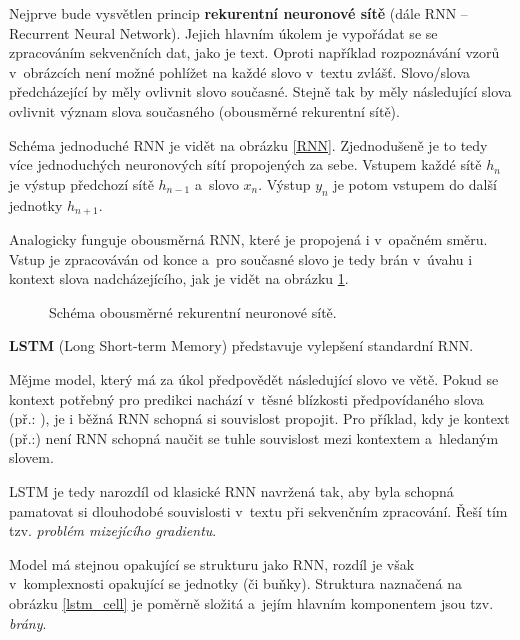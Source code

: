 Nejprve bude vysvětlen princip \textbf{rekurentní neuronové sítě} (dále RNN -- Recurrent Neural Network).
Jejich hlavním úkolem je vypořádat se se zpracováním sekvenčních dat, jako je text. Oproti například rozpoznávání vzorů v~obrázcích není možné pohlížet na každé slovo v~textu zvlášť. Slovo/slova předcházející by měly ovlivnit slovo současné. Stejně tak by měly následující slova ovlivnit význam slova současného (obousměrné rekurentní sítě).\par
Schéma jednoduché RNN je vidět na obrázku \ref{RNN}. Zjednodušeně je to tedy více jednoduchých neuronových sítí propojených za sebe. Vstupem každé sítě $h_n$ je výstup předchozí sítě $h_{n-1}$ a~slovo $x_n$. Výstup $y_n$ je potom vstupem do další jednotky $h_{n+1}$.\par
Analogicky funguje obousměrná RNN, které je propojená i v~opačném směru. Vstup je zpracováván od konce a~pro současné slovo je tedy brán v~úvahu i kontext slova nadcházejícího, jak je vidět na obrázku \ref{bidirRNN}.\par

\begin{figure}[hbt]
    \centering
	\caption{Schéma obousměrné rekurentní neuronové sítě.}
	\label{bidirRNN}
\end{figure}

\pagebreak\textbf{LSTM} (Long Short-term Memory) představuje vylepšení standardní RNN.\par \smallskip
Mějme model, který má za úkol předpovědět následující slovo ve větě. Pokud se kontext potřebný pro predikci nachází v~těsné blízkosti předpovídaného slova (př.: ), je i běžná RNN schopná si souvislost propojit. Pro příklad, kdy je kontext  (př.:) není RNN schopná naučit se tuhle souvislost mezi kontextem a~hledaným slovem.\par \smallskip
LSTM je tedy narozdíl od klasické RNN navržená tak, aby byla schopná pamatovat si dlouhodobé souvislosti v~textu při sekvenčním zpracování. Řeší tím tzv. \emph{problém mizejícího gradientu}.\par
Model má stejnou opakující se strukturu jako RNN, rozdíl je však v~komplexnosti opakující se jednotky (či buňky). Struktura naznačená na obrázku \ref{lstm_cell} je poměrně složitá a~jejím hlavním komponentem jsou tzv. \emph{brány}. 

